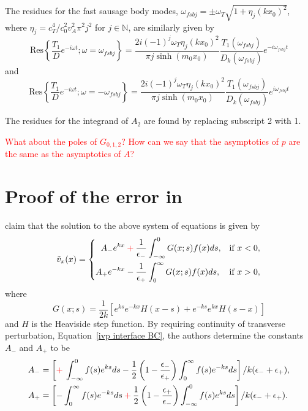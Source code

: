 \documentclass[12pt]{../style-files/ociamthesis}
\begin{document}
The residues for the fast sausage body modes, $\omega_{fsbj} = \pm \omega_T\sqrt{1 + \eta_j(kx_0)^2}$, where $\eta_j = c_T^4 / c_0^2v_A^2\pi^2j^2$ for $j \in \mathbb{N}$, are similarly given by
\begin{equation}
\mathrm{Res}\left\{ \frac{T_1}{D}e^{-i\omega t}; \omega = \omega_{fsbj} \right\} = \frac{2i(-1)^{j}\omega_T\eta_j(kx_0)^2}{\pi j\sinh(m_0x_0)} \frac{T_1(\omega_{fsbj})}{D_k(\omega_{fsbj})}e^{-i\omega_{fsbj}t}
\end{equation}
and
\begin{equation}
\mathrm{Res}\left\{ \frac{T_1}{D}e^{-i\omega t}; \omega = -\omega_{fsbj} \right\} = \frac{2i(-1)^{j}\omega_T\eta_j(kx_0)^2}{\pi j\sinh(m_0x_0)} \frac{T_1(\omega_{fsbj})}{D_k(\omega_{fsbj})}e^{i\omega_{fsbj}t}
\end{equation}

The residues for the integrand of $A_2$ are found by replacing subscript 2 with 1.


\textcolor{red}{What about the poles of $G_{0,1,2}$? How can we say that the asymptotics of $p$ are the same as the asymptotics of $A$?}


\appendix

\section{Proof of the error in \cite{rae_etal81}}

\cite{rae_etal81} claim that the solution to the above system of equations is given by 
\begin{equation}
\tilde{v}_x(x) = \left\{
\begin{aligned}
A_-e^{kx}  \: \textcolor{red}{+} \: \frac{1}{\epsilon_-} & \int_{-\infty}^{0} G(x;s)f(x)ds, & \text{if  } x<0,\\
A_+e^{-kx} - \frac{1}{\epsilon_+} & \int_{0}^{\infty} G(x;s)f(x)ds, & \text{if  } x>0,
\end{aligned}
\right.
\label{ivp interface sol}
\end{equation}
where
\begin{equation}
G(x;s) = \frac{1}{2k}[e^{ks}e^{-kx}H(x-s) + e^{-ks}e^{kx}H(s-x)]
\end{equation}
and $H$ is the Heaviside step function. By requiring continuity of transverse perturbation, Equation~\eqref{ivp interface BC}, the authors determine the constants $A_-$ and $A_+$ to be
\begin{align}
A_- & = \left[\textcolor{red}{+} \: \int_{-\infty}^0 f(s)e^{ks} ds - \frac{1}{2}\left(1 - \frac{\epsilon_-}{\epsilon_+}\right)\int_0^\infty f(s)e^{-ks} ds\right] / k(\epsilon_- + \epsilon_+), \\
A_+ & = \left[-\int_0^\infty f(s)e^{-ks} ds \: \textcolor{red}{+} \: \frac{1}{2}\left(1 - \frac{\epsilon_+}{\epsilon_-}\right)\int_{-\infty}^0 f(s)e^{ks} ds\right] / k(\epsilon_- + \epsilon_+).
\label{ivp interface constants}
\end{align}
\end{document}
